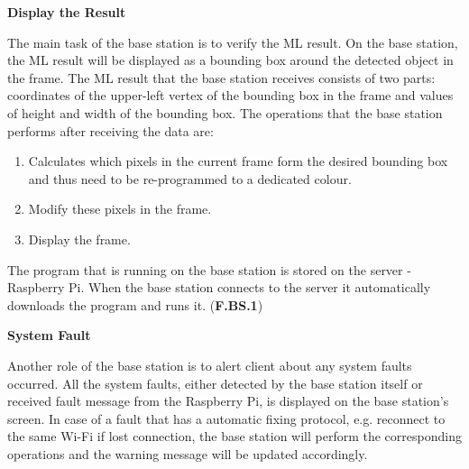 \textbf{Display the Result}

The main task of the base station is to verify the ML result. On the base station, the ML result will be displayed as a bounding box around the detected object in the frame. The ML result that the base station receives consists of two parts: coordinates of the upper-left vertex of the bounding box in the frame and values of height and width of the bounding box. The operations that the base station performs after receiving the data are:
\begin{enumerate}
    \item Calculates which pixels in the current frame form the desired bounding box and thus need to be re-programmed to a dedicated colour.
    \item Modify these pixels in the frame.
    \item Display the frame.
\end{enumerate}

The program that is running on the base station is stored on the server - Raspberry Pi. When the base station connects to the server it automatically downloads the program and runs it. (\textbf{F.BS.1})

\textbf{System Fault}

Another role of the base station is to alert client about any system faults occurred. All the system faults, either detected by the base station itself or received fault message from the Raspberry Pi, is displayed on the base station's screen. In case of a fault that has a automatic fixing protocol, e.g. reconnect to the same Wi-Fi if lost connection, the base station will perform the corresponding operations and the warning message will be updated accordingly.
